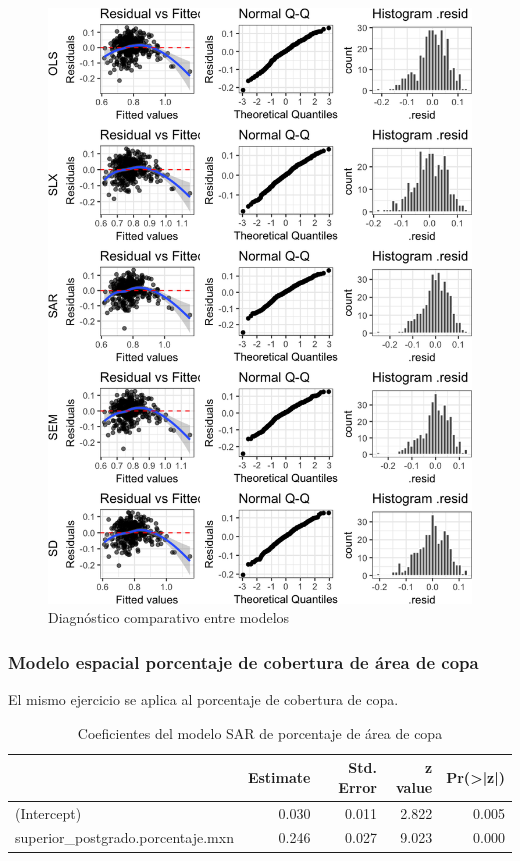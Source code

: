 \documentclass[12pt,]{book}
\begin{document}
\begin{figure}
\includegraphics[width=1\linewidth]{tesis-unigis_files/figure-latex/diag-model-espaciales-1} \caption{Diagnóstico comparativo entre modelos}\label{fig:diag-model-espaciales}
\end{figure}

\subsubsection{Modelo espacial porcentaje de cobertura de área de
copa}\label{modelo-espacial-porcentaje-de-cobertura-de-area-de-copa}

El mismo ejercicio se aplica al porcentaje de cobertura de copa.

\begin{table}

\caption{\label{tab:coef-sar-copaap}Coeficientes del modelo SAR de porcentaje de área de copa}
\centering
\begin{tabular}[t]{lrrrr}
\toprule
  & Estimate & Std. Error & z value & Pr(>|z|)\\
\midrule
(Intercept) & 0.030 & 0.011 & 2.822 & 0.005\\
superior\_postgrado.porcentaje.mxn & 0.246 & 0.027 & 9.023 & 0.000\\
\bottomrule
\end{tabular}
\end{table}
\end{document}
